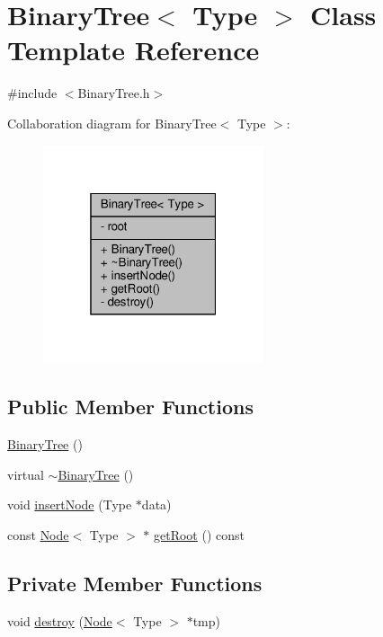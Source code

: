 \hypertarget{class_binary_tree}{}\section{Binary\+Tree$<$ Type $>$ Class Template Reference}
\label{class_binary_tree}


{\ttfamily \#include $<$Binary\+Tree.\+h$>$}



Collaboration diagram for Binary\+Tree$<$ Type $>$\+:
\nopagebreak
\begin{figure}[H]
\begin{center}
\leavevmode
\includegraphics[width=184pt]{class_binary_tree__coll__graph}
\end{center}
\end{figure}
\subsection*{Public Member Functions}
\begin{DoxyCompactItemize}
\item 
\hyperlink{class_binary_tree_a9f5a2d791e391c6195ef290303973e15}{Binary\+Tree} ()
\item 
virtual \hyperlink{class_binary_tree_a2bad873a7fc094d66a3076a86d11c428}{$\sim$\+Binary\+Tree} ()
\item 
void \hyperlink{class_binary_tree_a69ae782d438253d40cbd194737feca17}{insert\+Node} (Type $\ast$data)
\item 
const \hyperlink{class_node}{Node}$<$ Type $>$ $\ast$ \hyperlink{class_binary_tree_a9ee0cf09781cf2ecc471aacc61848dde}{get\+Root} () const
\end{DoxyCompactItemize}
\subsection*{Private Member Functions}
\begin{DoxyCompactItemize}
\item 
void \hyperlink{class_binary_tree_a9b20827d019844170bb09465f885fef4}{destroy} (\hyperlink{class_node}{Node}$<$ Type $>$ $\ast$tmp)
\end{DoxyCompactItemize}
